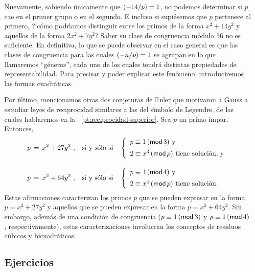 %
Nuevamente, sabiendo \'unicamente que $\tlegendre{-14} p=1$,
no podemos determinar si $p$ cae en el primer grupo o en el
segundo. E incluso si supi\'esemos que $p$ pertenece al primero,
?`c\'omo podr\'{\i}amos distinguir entre los primos de la forma
$x^2+14y^2$ y aquellos de la forma $2x^2+7y^2$?
Saber su clase de congruencia m\'odulo $56$ no es suficiente.
En definitiva, lo que se puede observar en el caso general es
que las clases de congruencia para las cuales $\tlegendre{-n} p=1$
se agrupan en lo que llamaremos ``g\'eneros'', cada uno de los
cuales tendr\'a distintas propiedades de representabilidad.
Para precisar y poder explicar este fen\'omeno, introduciremos
las formas cuadr\'aticas.


Por \'ultimo, mencionamos otras dos conjeturas de Euler que
motivaron a Gauss a estudiar leyes de reciprocidad similares
a las del s\'{\i}mbolo de Legendre, de las cuales hablaremos
en la \partname~\ref{pt:reciprocidad-superior}.
Sea $p$ un primo impar. Entonces,
\begin{displaymath}
	\begin{aligned}
		p\,=\,x^2+27y^2\text{ ,} &
			\quad\text{si y s\'olo si}\quad
			\left\{
			\begin{array}{l}
				p\equiv 1\tmodulo[3]
					\text{ y} \\[5pt]
				2\equiv x^3\tmodulo[p]
				\text{ tiene soluci\'on, y}
			\end{array}
			\right. \\[10pt]
		p\,=\,x^2+64y^2\text{ ,} &
			\quad\text{si y s\'olo si}\quad
			\left\{
			\begin{array}{l}
				p\equiv 1\tmodulo[4]
					\text{ y} \\[5pt]
				2\equiv x^4\tmodulo[p]
				\text{ tiene soluci\'on.}
			\end{array}
			\right.
	\end{aligned}
\end{displaymath}
%
Estas afirmaciones caracterizan los primos $p$ que se pueden
expresar en la forma $p=x^2+27y^2$ y aquellos que se pueden
expresar en la forma $p=x^2+64y^2$.
Sin embargo, adem\'as de una condici\'on de congruencia
($p\equiv 1\tmodulo[3]$ y $p\equiv 1\tmodulo[4]$, respectivamente),
estas caracterizaciones involucran los conceptos de residuos
c\'ubicos y bicuadr\'aticos.

\subsection*{Ejercicios}


